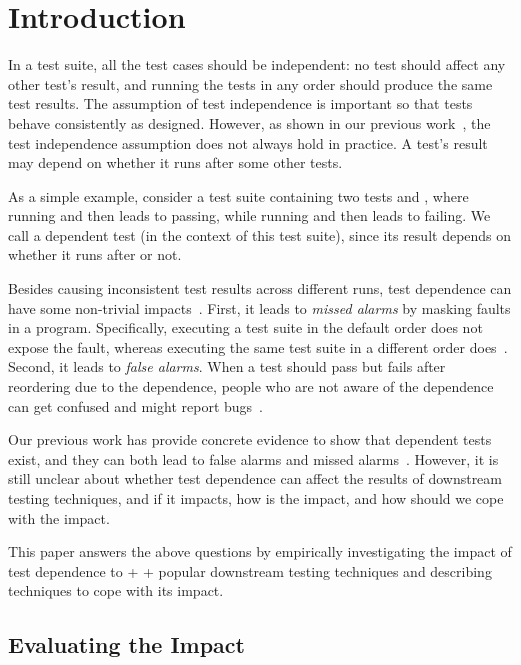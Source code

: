 \section{Introduction}


In a test suite, all the test cases should be independent:
no test should affect any other test's result, and running
the tests in any order should produce the same test results.
The assumption of test independence is important so that
tests behave consistently as designed. However,
as shown in our previous work~\cite{testdependence}, the test independence
assumption does not always hold in practice.
A test's result may depend on whether it runs after
some other tests. 

As a simple example, consider 
a test suite containing two tests  and ,
where running  and then 
leads to  passing, while running  and
then  leads to  failing. We call
 a dependent test (in the context of this test suite),
since its result depends on whether it runs after  or not.


Besides causing inconsistent test results across different runs,
test dependence can have some non-trivial impacts~\cite{testdependence}. First,
it leads to \textit{missed alarms} by masking faults in a program.
Specifically, executing a test suite in the default order does not
expose the fault, whereas executing the same test suite in
a different order does~\cite{clibug}. Second, 
it leads to \textit{false alarms}.
When a test should pass but fails after reordering due to
the dependence, people who are not aware of the dependence
can get confused and might report bugs~\cite{eclipsebug}. 



Our previous work has provide concrete evidence to
show that dependent tests exist, and they can both lead
to false alarms and missed alarms~\cite{testdependence}.
However, it is still unclear about whether test dependence can affect the
results of downstream testing techniques, and if it
impacts, how is the impact, and how should we cope with the impact.

This paper answers the above questions by empirically
investigating the impact of test dependence to
\prionum + \selnum + \parnum popular downstream testing techniques
and describing techniques to cope with its impact.

\subsection{Evaluating the Impact}

